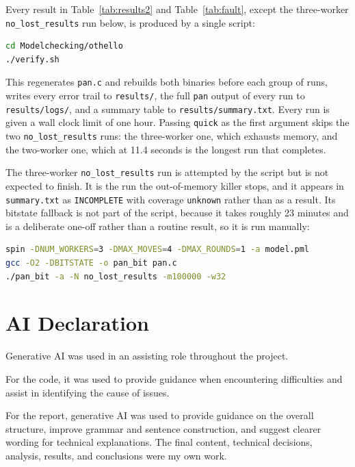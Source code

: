 \documentclass[10pt,a4paper]{article}
\newcommand{\code}[1]{\texttt{#1}}
\begin{document}
Every result in Table~\ref{tab:results2} and Table~\ref{tab:fault}, except
the three-worker \code{no\_lost\_results} run below, is produced by a single
script:

\begin{lstlisting}[language=bash,caption={Build and run everything}]
cd Modelchecking/othello
./verify.sh
\end{lstlisting}

This regenerates \code{pan.c} and rebuilds both binaries before each group
of runs, writes every error trail to \code{results/}, the full \code{pan}
output of every run to \code{results/logs/}, and a summary table to
\code{results/summary.txt}. Every run is given a wall clock limit of one
hour. Passing \code{quick} as the first argument skips the two
\code{no\_lost\_results} runs: the three-worker one, which exhausts
memory, and the two-worker one, which at 11.4 seconds is the longest run
that completes.

The three-worker \code{no\_lost\_results} run is attempted by the script
but is not expected to finish. It is the run the out-of-memory killer
stops, and it appears in \code{summary.txt} as \code{INCOMPLETE} with
coverage \code{unknown} rather than as a result. Its bitstate fallback is
not part of the script, because it takes roughly 23 minutes and is a
deliberate one-off rather than a routine result, so it is run manually:

\begin{lstlisting}[language=bash,caption={Three-worker \code{no\_lost\_results}, bitstate fallback}]
spin -DNUM_WORKERS=3 -DMAX_MOVES=4 -DMAX_ROUNDS=1 -a model.pml
gcc -O2 -DBITSTATE -o pan_bit pan.c
./pan_bit -a -N no_lost_results -m100000 -w32
\end{lstlisting}

\section*{AI Declaration}
Generative AI was used in an assisting role throughout the project. 

For the code, it was used to provide guidance when encountering difficulties and
assist in identifying the cause of issues.

For the report, generative AI was used to provide guidance on the overall 
structure, improve grammar and sentence construction, and suggest clearer 
wording for technical explanations. The final content, technical decisions, 
analysis, results, and conclusions were my own work.



\end{document}
